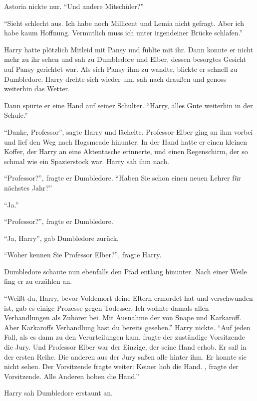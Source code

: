 Astoria nickte nur. \enquote{Und andere Mitschüler?}

\enquote{Sieht schlecht aus. Ich habe noch Millicent und Lemia nicht gefragt. Aber ich habe kaum Hoffnung. Vermutlich muss ich unter irgendeiner Brücke schlafen.}

Harry hatte plötzlich Mitleid mit Pansy und fühlte mit ihr. Dann konnte er nicht mehr zu ihr sehen und sah zu Dumbledore und Elber, dessen besorgtes Gesicht auf Pansy gerichtet war. Als sich Pansy ihm zu wandte, blickte er schnell zu Dumbledore. Harry drehte sich wieder um, sah nach draußen und genoss weiterhin das Wetter.

Dann spürte er eine Hand auf seiner Schulter. \enquote{Harry, alles Gute weiterhin in der Schule.}

\enquote{Danke, Professor}, sagte Harry und lächelte. Professor Elber ging an ihm vorbei und lief den Weg nach Hogsmeade hinunter. In der Hand hatte er einen kleinen Koffer, der Harry an eine Aktentasche erinnerte, und einen Regenschirm, der so schmal wie ein Spazierstock war. Harry sah ihm nach.

\enquote{Professor?}, fragte er Dumbledore. \enquote{Haben Sie schon einen neuen Lehrer für nächstes Jahr?}

\enquote{Ja.}

\enquote{Professor?}, fragte er Dumbledore.

\enquote{Ja, Harry}, gab Dumbledore zurück.

\enquote{Woher kennen Sie Professor Elber?}, fragte Harry.

Dumbledore schaute nun ebenfalls den Pfad entlang hinunter. Nach einer Weile fing er zu erzählen an.

\enquote{Weißt du, Harry, bevor Voldemort deine Eltern ermordet hat und verschwunden ist, gab es einige Prozesse gegen Todesser. Ich wohnte damals allen Verhandlungen als Zuhörer bei. Mit Ausnahme der von Snape und Karkaroff. Aber Karkaroffs Verhandlung hast du bereits gesehen.} Harry nickte. \enquote{Auf jeden Fall, als es dann zu den Verurteilungen kam, fragte der zuständige Vorsitzende die Jury.  Und Professor Elber war der Einzige, der seine Hand erhob. Er saß in der ersten Reihe. Die anderen aus der Jury saßen alle hinter ihm. Er konnte sie nicht sehen. Der Vorsitzende fragte weiter:  Keiner hob die Hand. , fragte der Vorsitzende. Alle Anderen hoben die Hand.}

Harry sah Dumbledore erstaunt an.

